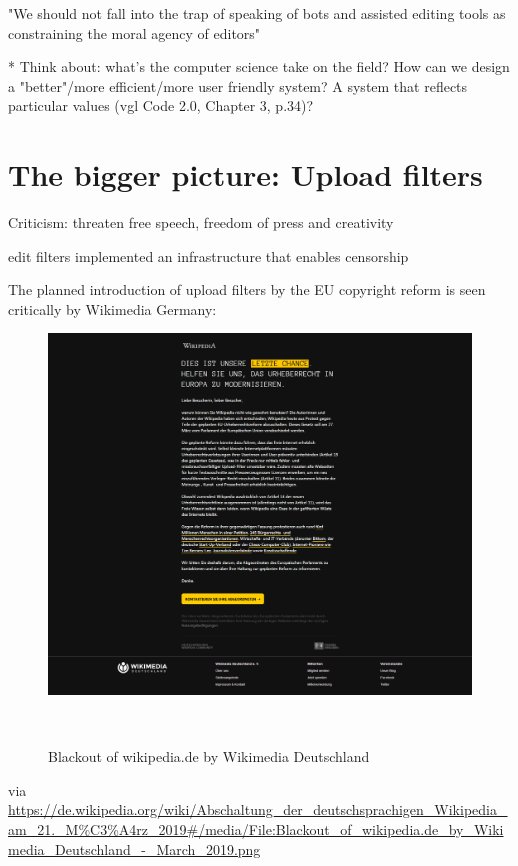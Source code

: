 \cite{GeiRib2010}
"We should not fall into the trap of speaking of bots and
assisted editing tools as constraining the moral agency of
editors"

* Think about: what's the computer science take on the field? How can we design a "better"/more efficient/more user friendly system? A system that reflects particular values (vgl Code 2.0, Chapter 3, p.34)?


\section{The bigger picture: Upload filters}

Criticism: threaten free speech, freedom of press and creativity

edit filters implemented an infrastructure that enables censorship


The planned introduction of upload filters by the EU copyright reform is seen critically by Wikimedia Germany:
\begin{figure}
\centering
  \includegraphics[width=0.9\columnwidth]{pics/Blackout_of_wikipediade_by_Wikimedia_Deutschland_-_March_2019.png}
  \caption{Blackout of wikipedia.de by Wikimedia Deutschland}~\label{fig:blackout-upload-filters}
\end{figure}

via
\url{https://de.wikipedia.org/wiki/Abschaltung_der_deutschsprachigen_Wikipedia_am_21._M%C3%A4rz_2019#/media/File:Blackout_of_wikipedia.de_by_Wikimedia_Deutschland_-_March_2019.png}


